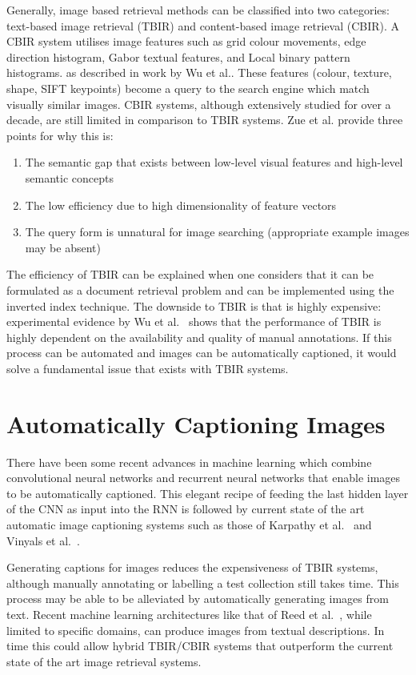 Generally, image based retrieval methods can be classified into two categories: text-based image retrieval (TBIR) and content-based image retrieval (CBIR). A CBIR system utilises image features such as grid colour movements, edge direction histogram, Gabor textual features, and Local binary pattern histograms. as described in work by Wu et al.\cite{wu2009distance}. These features (colour, texture, shape, SIFT keypoints) become a query to the search engine which match visually similar images. CBIR systems, although extensively studied for over a decade, are still limited in comparison to TBIR systems. Zue et al.\cite{zhu2010image} provide three points for why this is:
\begin{enumerate}
    \item The semantic gap that exists between low-level visual features and high-level semantic concepts
    \item The low efficiency due to high dimensionality of feature vectors
    \item The query form is unnatural for image searching (appropriate example images may be absent)
\end{enumerate}
The efficiency of TBIR can be explained when one considers that it can be formulated as a document retrieval problem and can be implemented using the inverted index technique. The downside to TBIR is that is highly expensive: experimental evidence by Wu et al.~\cite{wu2013tag} shows that the performance of TBIR is highly dependent on the availability and quality of manual annotations. If this process can be automated and images can be automatically captioned, it would solve a fundamental issue that exists with TBIR systems.

\section{Automatically Captioning Images}

There have been some recent advances in machine learning which combine convolutional neural networks and recurrent neural networks that enable images to be automatically captioned. This elegant recipe of feeding the last hidden layer of the CNN as input into the RNN is followed by current state of the art automatic image captioning systems such as those of Karpathy et al.~\cite{karpathy2015deep} and Vinyals et al.~\cite{arXiv2016160906647V}.

Generating captions for images reduces the expensiveness of TBIR systems, although manually annotating or labelling a test collection still takes time. This process may be able to be alleviated by automatically generating images from text. Recent machine learning architectures like that of Reed et al.~\cite{reed2016generative}, while limited to specific domains, can produce images from textual descriptions. In time this could allow hybrid TBIR/CBIR systems that outperform the current state of the art image retrieval systems.

